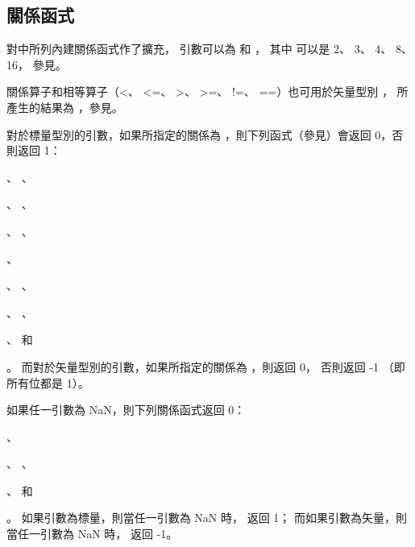 \subsection[sec:relationFunc]{關係函式}

對中所列內建關係函式作了擴充，
引數可以為  和 ，
其中  可以是 2、 3、 4、 8、 16，
參見。

關係算子和相等算子（<、 <=、 >、 >=、 !=、 ==）也可用於矢量型別 ，
所產生的結果為 ，參見。

對於標量型別的引數，如果所指定的關係為 {}，則下列函式（參見）會返回 0，否則返回 1：
\startigBase[indentnext=no]
\item {}、 、
\item {}、 、
\item {}、 、
\item {}、
\item {}、 、
\item {}、 、
\item {}、  和
\item {}。
\stopigBase
而對於矢量型別的引數，如果所指定的關係為 {}，則返回 0，
否則返回 -1 （即所有位都是 1）。

如果任一引數為 NaN，則下列關係函式返回 0：
\startigBase[indentnext=no]
\item {}、
\item {}、 、
\item {}、  和
\item {}。
\stopigBase
如果引數為標量，則當任一引數為 NaN 時，  返回 1；
而如果引數為矢量，則當任一引數為 NaN 時，  返回 -1。

{}

